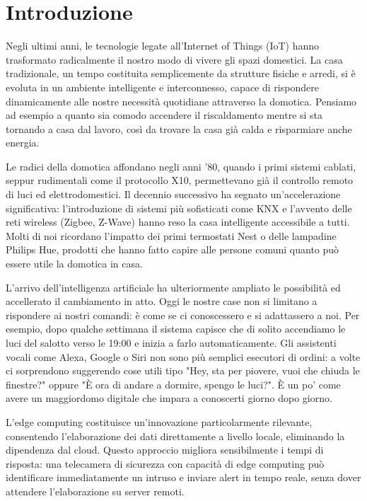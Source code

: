 \chapter{Introduzione}
Negli ultimi anni, le tecnologie legate all'Internet of Things (IoT) hanno trasformato radicalmente il nostro modo di vivere gli spazi domestici. La casa tradizionale, un tempo costituita semplicemente da strutture fisiche e arredi, si è evoluta in un ambiente intelligente e interconnesso, capace di rispondere dinamicamente alle nostre necessità quotidiane attraverso la domotica. Pensiamo ad esempio a quanto sia comodo accendere il riscaldamento mentre si sta tornando a casa dal lavoro, così da trovare la casa già calda e risparmiare anche energia.

\vspace{0.5cm}
Le radici della domotica affondano negli anni '80, quando i primi sistemi cablati, seppur rudimentali come il protocollo X10, permettevano già il controllo remoto di luci ed elettrodomestici. Il decennio successivo ha segnato un'accelerazione significativa: l'introduzione di sistemi più sofisticati come KNX e l'avvento delle reti wireless (Zigbee, Z-Wave) hanno reso la casa intelligente accessibile a tutti. Molti di noi ricordano l'impatto dei primi termostati Nest o delle lampadine Philips Hue, prodotti che hanno fatto capire alle persone comuni quanto può essere utile la domotica in casa.

\vspace{0.5cm}
L'arrivo dell'intelligenza artificiale ha ulteriormente ampliato le possibilità ed accellerato il cambiamento in atto. Oggi le nostre case non si limitano a rispondere ai nostri comandi: è come se ci conoscessero e si adattassero a noi. Per esempio, dopo qualche settimana il sistema capisce che di solito accendiamo le luci del salotto verso le 19:00 e inizia a farlo automaticamente. Gli assistenti vocali come Alexa, Google o Siri non sono più semplici esecutori di ordini: a volte ci sorprendono suggerendo cose utili tipo "Hey, sta per piovere, vuoi che chiuda le finestre?" oppure "È ora di andare a dormire, spengo le luci?". È un po' come avere un maggiordomo digitale che impara a conoscerti giorno dopo giorno.

\vspace{0.5cm}
L'edge computing costituisce un'innovazione particolarmente rilevante, consentendo l'elaborazione dei dati direttamente a livello locale, eliminando la dipendenza dal cloud. Questo approccio migliora sensibilmente i tempi di risposta: una telecamera di sicurezza con capacità di edge computing può identificare immediatamente un intruso e inviare alert in tempo reale, senza dover attendere l'elaborazione su server remoti.


